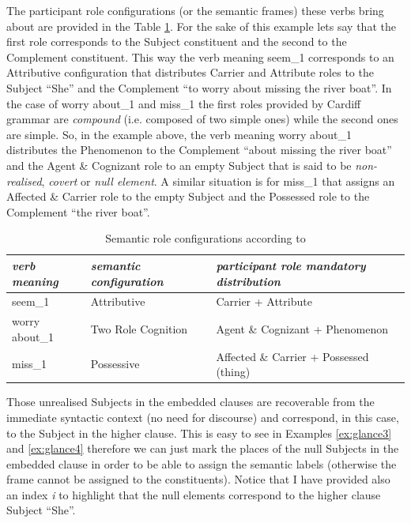 The participant role configurations (or the semantic frames) these verbs bring about are provided in the Table \ref{tab:semantic-role-distro}. For the sake of this example lets say that the first role corresponds to the Subject constituent and the second to the Complement constituent. This way the verb meaning seem_{1} corresponds to an Attributive configuration that distributes Carrier and Attribute roles to the Subject ``She'' and the Complement ``to worry about missing the river boat''. In the case of worry about_1 and miss_1 the first roles provided by Cardiff grammar are \textit{compound} (i.e. composed of two simple ones) while the second ones are simple. So, in the example above, the verb meaning worry about_1 distributes the Phenomenon to the Complement ``about missing the river boat'' and the Agent \& Cognizant role to an empty Subject that is said to be \textit{non-realised}, \textit{covert} or \textit{null element}. A similar situation is for miss_1 that assigns an Affected \& Carrier role to the empty Subject and the Possessed role to the Complement ``the river boat''. 

\begin{table}[!ht]
    \centering
    \begin{tabular}{|l|l|l|}
        \hline
        \textit{verb meaning} & \textit{semantic configuration} & \textit{participant role mandatory distribution}  \\ \hline
        seem_{1}           & Attributive                     & Carrier + Attribute                     \\ \hline
        worry about_{1}   & Two Role Cognition              & Agent \& Cognizant + Phenomenon         \\ \hline
        miss_{1}           & Possessive                      & Affected \& Carrier + Possessed (thing) \\ \hline
    \end{tabular}
    \caption{Semantic role configurations according to \citet{Neale2002,Fawcett2009}}
    \label{tab:semantic-role-distro}
\end{table}

Those unrealised Subjects in the embedded clauses are recoverable from the immediate syntactic context (no need for discourse) and correspond, in this case, to the Subject in the higher clause. This is easy to see in Examples \ref{ex:glance3} and \ref{ex:glance4} therefore we can just mark the places of the null Subjects in the embedded clause in order to be able to assign the semantic labels (otherwise the frame cannot be assigned to the constituents). Notice that I have provided also an index \textit{i} to highlight that the null elements correspond to the higher clause Subject ``She''. 

